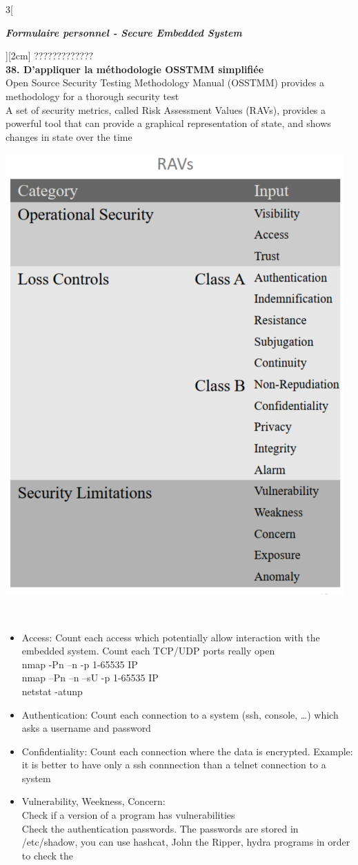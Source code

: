 \begin{multicols}{3}[\centerline{ \large\em \textbf{Formulaire personnel - Secure Embedded System}}][2cm]
?????????????
\\ \textbf{38. D’appliquer la méthodologie OSSTMM simplifiée\\}
Open Source Security Testing Methodology Manual (OSSTMM) provides a
methodology for a thorough security test\\
A set of security metrics, called Risk Assessment Values (RAVs), provides a
powerful tool that can provide a graphical representation of state, and shows
changes in state over the time\\
\begin{minipage}{\linewidth}
	\centering
    \includegraphics[width =0.4\columnwidth]{images/24.png}
\end{minipage}\\
\begin{itemize}
\item Access: Count each access which potentially allow interaction with the embedded system. Count each TCP/UDP ports really open\\
nmap -Pn –n -p 1-65535 IP\\
nmap –Pn –n –sU -p 1-65535 IP\\
netstat -atunp
\item Authentication: Count each connection to a system (ssh, console, …) which asks a username and password
\item Confidentiality: Count each connection where the data is encrypted. Example: it is better to have only a ssh connnection than a telnet connection to a system
\item Vulnerability, Weekness, Concern:\\
Check if a version of a program has vulnerabilities\\
Check the authentication passwords. The passwords are stored in /etc/shadow,
you can use hashcat, John the Ripper, hydra programs in order to check the

\end{itemize}
\end{multicols}
